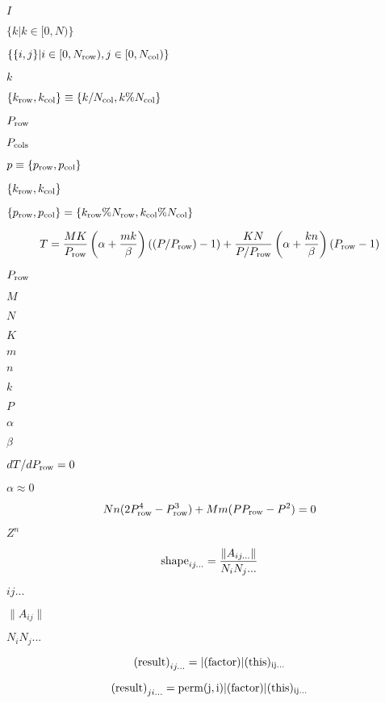 \documentclass{article}
\begin{document}
$ I $
\pagebreak

$ \{ k | k \in [0,N) \} $
\pagebreak

$ \{ \{i,j\} | i \in [0,N_{\rm row}),j\in[0,N_{\rm col})\} $
\pagebreak

$ k $
\pagebreak

$ \{ k_{\rm row}, k_{\rm col} \} \equiv \{ k / N_{\rm col}, k \% N_{\rm col} \} $
\pagebreak

$ P_{\rm row} $
\pagebreak

$ P_{\rm cols} $
\pagebreak

$ p \equiv \{ p_{\rm row}, p_{\rm col} \} $
\pagebreak

$ \{ k_{\rm row}, k_{\rm col} \} $
\pagebreak

$ \{ p_{\rm row}, p_{\rm col} \} = \{ k_{\rm row} \% N_{\rm row}, k_{\rm col} \% N_{\rm col} \} $
\pagebreak

\[ T = \frac{MK}{P_{\rm{row}}} \left(\alpha + \frac{mk}{\beta}\right) \left((P/P_{\rm{row}}) - 1\right) + \frac{KN}{P/P_{\rm{row}}} \left(\alpha + \frac{kn}{\beta}\right) \left(P_{\rm{row}} - 1\right) \]
\pagebreak

$P_{\rm{row}}$
\pagebreak

$M$
\pagebreak

$N$
\pagebreak

$K$
\pagebreak

$m$
\pagebreak

$n$
\pagebreak

$k$
\pagebreak

$P$
\pagebreak

$\alpha$
\pagebreak

$\beta$
\pagebreak

$dT/dP_{\rm{row}} = 0$
\pagebreak

$\alpha \approx 0$
\pagebreak

\[ Nn(2 P_{\rm{row}}^4 - P_{\rm{row}}^3) + Mm(P P_{\rm{row}} - P^2) = 0 \]
\pagebreak

$ Z^n $
\pagebreak

\[ {\rm{shape}}_{ij...} = \frac{\|A_{ij...}\|}{N_i N_j ...} \]
\pagebreak

$ij...$
\pagebreak

$\|A_{ij}\|$
\pagebreak

$N_i N_j ...$
\pagebreak

\[ {(\rm{result})}_{ij...} = |(\rm{factor})| (\rm{this})_{ij...} \]
\pagebreak

\[ {(\rm{result})}_{ji...} = \rm{perm}(j,i) |(\rm{factor})| (\rm{this})_{ij...} \]
\pagebreak
\end{document}
